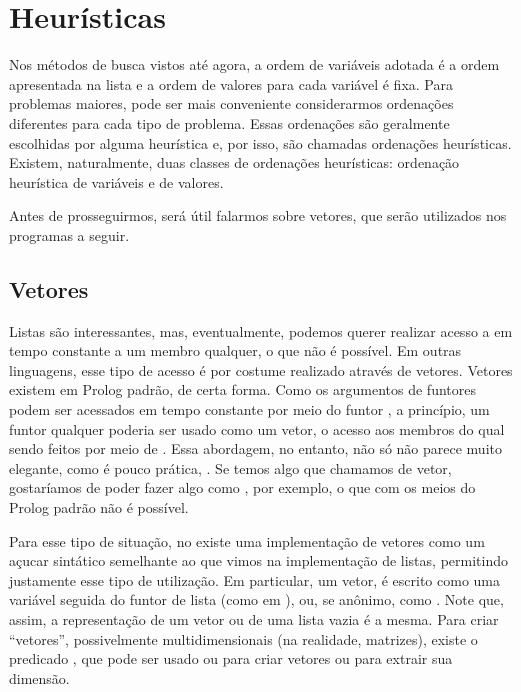 
%

%

\section{Heurísticas}

Nos métodos de busca vistos até agora, a ordem de variáveis adotada é a ordem apresentada na lista
e a ordem de valores para cada variável é fixa. Para problemas maiores, pode ser mais conveniente
considerarmos ordenações diferentes para cada tipo de problema. Essas ordenações são geralmente
escolhidas por alguma heurística e, por isso, são chamadas ordenações heurísticas. Existem,
naturalmente, duas classes de ordenações heurísticas: ordenação heurística de variáveis e de
valores.

Antes de prosseguirmos, será útil falarmos sobre vetores, que serão utilizados nos programas a
seguir.

\subsection{Vetores}

Listas são interessantes, mas, eventualmente, podemos querer realizar acesso a em tempo constante a
um membro qualquer, o que não é possível. Em outras linguagens, esse tipo de acesso é por costume
realizado através de vetores. Vetores existem em Prolog padrão, de certa forma. Como os argumentos
de funtores podem ser acessados em tempo constante por meio do funtor , a princípio,
um funtor qualquer poderia ser usado como um vetor, o acesso aos membros do qual sendo feitos por meio de
. Essa abordagem, no entanto, não só não parece muito elegante, como é pouco prática, .
Se temos algo que chamamos de vetor, gostaríamos de poder fazer algo como , por
exemplo, o que com os meios do Prolog padrão não é possível.

Para esse tipo de situação, no \eclipse existe uma implementação de vetores como um açucar
sintático semelhante ao que vimos na implementação de listas, permitindo justamente esse tipo de
utilização. Em particular, um vetor, é escrito como uma variável seguida do funtor de lista (como
em ), ou, se anônimo, como . Note que, assim, a representação de
um vetor ou de uma lista vazia é a mesma. Para criar ``vetores'', possivelmente multidimensionais
(na realidade, matrizes), existe o predicado , que pode ser usado ou para criar vetores
ou para extrair sua dimensão.

